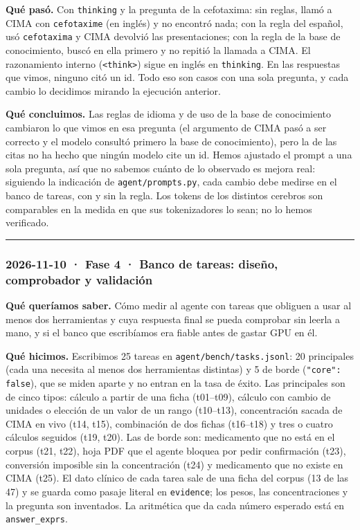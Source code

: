 \textbf{Qué pasó.} Con \texttt{thinking} y la pregunta de la cefotaxima: sin reglas, llamó a CIMA con \texttt{cefotaxime}
(en inglés) y no encontró nada; con la regla del español, usó \texttt{cefotaxima} y CIMA devolvió las
presentaciones; con la regla de la base de conocimiento, buscó en ella primero y no repitió la llamada
a CIMA. El razonamiento interno (\texttt{\textless{}think\textgreater{}})
sigue en inglés en \texttt{thinking}. En las respuestas que vimos, ninguno citó un id. Todo eso son
casos con una sola pregunta, y cada cambio lo decidimos mirando la ejecución anterior.

\textbf{Qué concluimos.} Las reglas de idioma y de uso de la base de conocimiento cambiaron lo que vimos en esa
pregunta (el argumento de CIMA pasó a ser correcto y el modelo consultó primero la base de conocimiento), pero
la de las citas no ha hecho que ningún modelo cite un id. Hemos
ajustado el prompt a una sola pregunta, así que no sabemos cuánto de lo observado es mejora real:
siguiendo la indicación de \texttt{agent/\allowbreak{}prompts.py}, cada cambio debe medirse en el banco de tareas, con y
sin la regla. Los tokens de los distintos cerebros son comparables en la medida en que sus
tokenizadores lo sean; no lo hemos verificado.

\begin{center}\rule{0.5\linewidth}{0.5pt}\end{center}

\subsubsection{2026-11-10 · Fase 4 · Banco de tareas: diseño, comprobador y validación}

\textbf{Qué queríamos saber.} Cómo medir al agente con tareas que obliguen a usar al menos dos herramientas y
cuya respuesta final se pueda comprobar sin leerla a mano, y si el banco que escribíamos era fiable
antes de gastar GPU en él.

\textbf{Qué hicimos.} Escribimos 25 tareas en \texttt{agent/\allowbreak{}bench/\allowbreak{}tasks.jsonl}: 20 principales (cada una necesita al
menos dos herramientas distintas) y 5 de borde (\texttt{"core": false}), que se miden aparte y no entran en la
tasa de éxito. Las principales son de cinco tipos: cálculo a partir de una ficha (t01--t09), cálculo con
cambio de unidades o elección de un valor de un rango (t10--t13), concentración sacada de CIMA en vivo
(t14, t15), combinación de dos fichas (t16--t18) y tres o cuatro cálculos seguidos (t19, t20). Las de
borde son: medicamento que no está en el corpus (t21, t22), hoja PDF que el agente bloquea por pedir
confirmación (t23), conversión imposible sin la concentración (t24) y medicamento que no existe en
CIMA (t25). El dato clínico de cada tarea sale de una ficha del corpus (13 de las 47) y se guarda como
pasaje literal en \texttt{evidence}; los pesos, las concentraciones y la pregunta son inventados. La
aritmética que da cada número esperado está en \texttt{answer\_\allowbreak{}exprs}.

